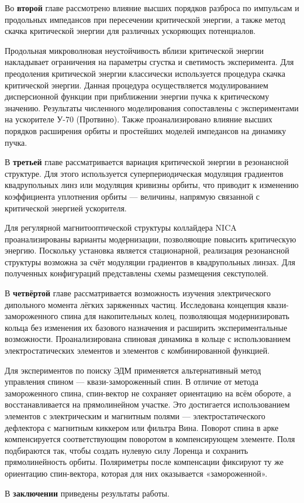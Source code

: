 \par Во \textbf{второй} главе рассмотрено влияние высших порядков разброса по импульсам и продольных импедансов при пересечении критической энергии, а также метод скачка критической энергии для различных ускоряющих потенциалов.

\par Продольная микроволновая неустойчивость вблизи критической энергии накладывает ограничения на параметры сгустка и светимость эксперимента. Для преодоления критической энергии классически используется процедура скачка критической энергии. Данная процедура осуществляется модулированием дисперсионной функции при приближении энергии пучка к критическому значению. Результаты численного моделирования сопоставлены с экспериментами на ускорителе У-70 (Протвино). Также проанализировано влияние высших порядков расширения орбиты и простейших моделей импедансов на динамику пучка.

\par В \textbf{третьей} главе рассматривается вариация критической энергии в резонансной структуре. Для этого используется суперпериодическая модуляция градиентов квадрупольных линз или модуляция кривизны орбиты, что приводит к изменению коэффициента уплотнения орбиты — величины, напрямую связанной с критической энергией ускорителя.

\par Для регулярной магнитооптической структуры коллайдера NICA проанализированы варианты модернизации, позволяющие повысить критическую энергию. Поскольку установка является стационарной, реализация резонансной структуры возможна за счёт модуляции градиентов в квадрупольных линзах. Для полученных конфигураций представлены схемы размещения секступолей.

В \textbf{четвёртой} главе рассматривается возможность изучения электрического дипольного момента лёгких заряженных частиц. Исследована концепция квази-замороженного спина для накопительных колец, позволяющая модернизировать кольца без изменения их базового назначения и расширить экспериментальные возможности. Проанализирована спиновая динамика в кольце с использованием электростатических элементов и элементов с комбинированной функцией.

\par Для экспериментов по поиску ЭДМ применяется альтернативный метод управления спином — квази-замороженный спин. В отличие от метода замороженного спина, спин-вектор не сохраняет ориентацию на всём обороте, а восстанавливается на прямолинейном участке. Это достигается использованием элементов с электрическим и магнитным полями — электростатического дефлектора с магнитным киккером или фильтра Вина. Поворот спина в арке компенсируется соответствующим поворотом в компенсирующем элементе. Поля подбираются так, чтобы создать нулевую силу Лоренца и сохранить прямолинейность орбиты. Поляриметры после компенсации фиксируют ту же ориентацию спин-вектора, которая для них оказывается «замороженной».

В \textbf{заключении} приведены результаты работы.